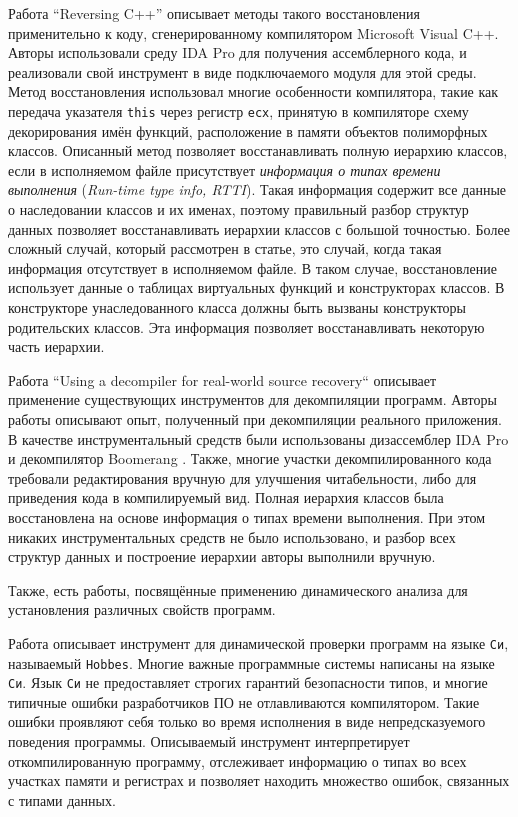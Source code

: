 \documentclass[a4paper,12pt,russian]{article}
\begin{document}
Работа ``Reversing C++'' \cite{reversing_cpp} описывает методы такого восстановления применительно к коду, сгенерированному компилятором Microsoft Visual C++.
Авторы использовали среду IDA Pro \cite{ida_pro} для получения ассемблерного кода, и реализовали свой инструмент в виде подключаемого модуля для этой среды.
Метод восстановления использовал многие особенности компилятора, такие как передача указателя \texttt{this} через регистр \texttt{ecx}, принятую в компиляторе схему декорирования имён функций, расположение в памяти объектов полиморфных классов.
Описанный метод позволяет восстанавливать полную иерархию классов, если в исполняемом файле присутствует \emph{информация о типах времени выполнения} (\emph{Run-time type info, RTTI}).
Такая информация содержит все данные о наследовании классов и их именах, поэтому правильный разбор структур данных позволяет восстанавливать иерархии классов с большой точностью.
Более сложный случай, который рассмотрен в статье, это случай, когда такая информация отсутствует в исполняемом файле.
В таком случае, восстановление использует данные о таблицах виртуальных функций и конструкторах классов.
В конструкторе унаследованного класса должны быть вызваны конструкторы родительских классов.
Эта информация позволяет восстанавливать некоторую часть иерархии.


Работа ``Using a decompiler for real-world source recovery`` \cite{real_decomp} описывает применение существующих инструментов для декомпиляции программ.
Авторы работы описывают опыт, полученный при декомпиляции реального приложения.
В качестве инструментальный средств были использованы дизассемблер IDA Pro \cite{ida_pro} и декомпилятор Boomerang \cite{boomerang}.
Также, многие участки декомпилированного кода требовали редактирования вручную для улучшения читабельности, либо для приведения кода в компилируемый вид.
Полная иерархия классов была восстановлена на основе информация о типах времени выполнения.
При этом никаких инструментальных средств не было использовано, и разбор всех структур данных и построение иерархии авторы выполнили вручную.

Также, есть работы, посвящённые применению динамического анализа для установления различных свойств программ.

Работа \cite{typechecking} описывает инструмент для динамической проверки программ на языке \texttt{Си}, называемый \texttt{Hobbes}.
Многие важные программные системы написаны на языке \texttt{Си}.
Язык \texttt{Си} не предоставляет строгих гарантий безопасности типов, и многие типичные ошибки разработчиков ПО не отлавливаются компилятором. Такие ошибки проявляют себя только во время исполнения в виде непредсказуемого поведения программы.
Описываемый инструмент интерпретирует откомпилированную программу, отслеживает информацию о типах во всех участках памяти и регистрах и позволяет находить множество ошибок, связанных с типами данных.
\end{document}
